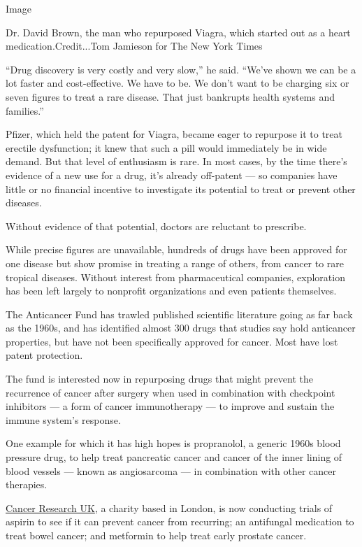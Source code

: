 Image

Dr. David Brown, the man who repurposed Viagra, which started out as a
heart medication.Credit...Tom Jamieson for The New York Times

``Drug discovery is very costly and very slow,'' he said. ``We've shown
we can be a lot faster and cost-effective. We have to be. We don't want
to be charging six or seven figures to treat a rare disease. That just
bankrupts health systems and families.''

Pfizer, which held the patent for Viagra, became eager to repurpose it
to treat erectile dysfunction; it knew that such a pill would
immediately be in wide demand. But that level of enthusiasm is rare. In
most cases, by the time there's evidence of a new use for a drug, it's
already off-patent --- so companies have little or no financial
incentive to investigate its potential to treat or prevent other
diseases.

Without evidence of that potential, doctors are reluctant to prescribe.

While precise figures are unavailable, hundreds of drugs have been
approved for one disease but show promise in treating a range of others,
from cancer to rare tropical diseases. Without interest from
pharmaceutical companies, exploration has been left largely to nonprofit
organizations and even patients themselves.

The Anticancer Fund has trawled published scientific literature going as
far back as the 1960s, and has identified almost 300 drugs that studies
say hold anticancer properties, but have not been specifically approved
for cancer. Most have lost patent protection.

The fund is interested now in repurposing drugs that might prevent the
recurrence of cancer after surgery when used in combination with
checkpoint inhibitors --- a form of cancer immunotherapy --- to improve
and sustain the immune system's response.

One example for which it has high hopes is propranolol, a generic 1960s
blood pressure drug, to help treat pancreatic cancer and cancer of the
inner lining of blood vessels --- known as angiosarcoma --- in
combination with other cancer therapies.

\href{https://www.cancerresearchuk.org/}{Cancer Research UK}, a charity
based in London, is now conducting trials of aspirin to see if it can
prevent cancer from recurring; an antifungal medication to treat bowel
cancer; and metformin to help treat early prostate cancer.

